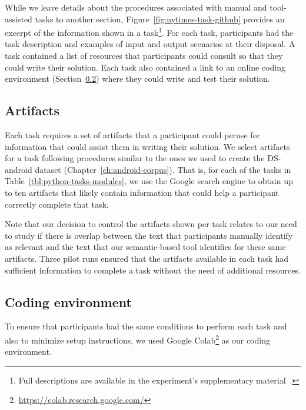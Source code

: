 While we leave details about the procedures associated with manual and tool-assisted tasks to another section, Figure~\ref{fig:nytimes-task-github} provides an excerpt of the information shown in a task\footnote{Full descriptions are available in the experiment's supplementary material~\red{\cite{}}.}.
For each task, participants had the task description and examples of input and output scenarios at their disposal. A task contained a list of resources that participants could consult 
so that they could write their solution.
Each task also contained a link to an online coding environment (Section~\ref{cp6:coding-environment})
where they could write and test their solution. 





\subsection{Artifacts}
\label{cp6:experiment-artifacts}


Each task requires a set of artifacts that a participant could peruse for information that could assist them in writing their solution.
We select artifacts for a task following procedures similar to the ones we used to create the \acs{DS-android} dataset (Chapter~\ref{ch:android-corpus}). 
That is, for each of the tasks in Table~\ref{tbl:python-tasks-modules}, we use the Google search engine to obtain up to ten artifacts that likely contain 
information that could help a participant correctly complete that task. 


Note that our decision to control the artifacts shown per task relates to our need to study if there is overlap between the text that participants manually identify as relevant and the text that our semantic-based tool identifies for these same artifacts. 
Three pilot runs ensured that the artifacts available in each task had sufficient information to complete a task without 
the need of additional resources. 


\subsection{Coding environment}
\label{cp6:coding-environment}



To ensure that participants had the same conditions to perform each task
and also to minimize setup instructions, we used Google Colab\footnote{\url{https://colab.research.google.com/}} as our coding environment. 


